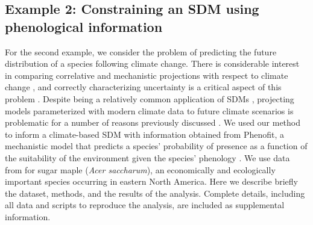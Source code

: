 \subsection*{Example 2: Constraining an SDM using phenological information}
For the second example, we consider the problem of predicting the future distribution of a species following climate change.
There is considerable interest in comparing correlative and mechanistic projections with respect to climate change \citep{Morin2009}, and correctly characterizing uncertainty is a critical aspect of this problem \citep{Cheaib2012}.
Despite being a relatively common application of \ac{SDM}s \citep{Guisan2005}, projecting models parameterized with modern climate data to future climate scenarios is problematic for a number of reasons previously discussed \citep{Araujo2006, Austin2011}.
We used our method to inform a climate-based SDM with information obtained from Phenofit, a mechanistic model that predicts a species' probability of presence as a function of the suitability of the environment given the species' phenology \citep{Chuine2001, Morin2009}.
We use data from \citet{Morin2009} for sugar maple (\emph{Acer saccharum}), an economically and ecologically important species occurring in eastern North America.
Here we describe briefly the dataset, methods, and the results of the analysis.
Complete details, including all data and scripts to reproduce the analysis, are included as supplemental information.

